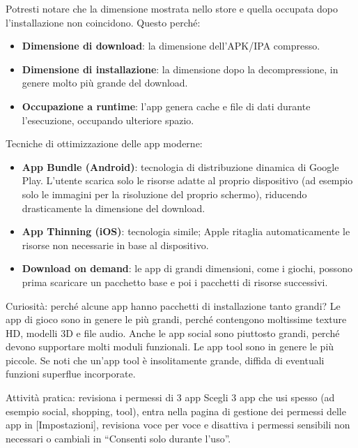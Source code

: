 
Potresti notare che la dimensione mostrata nello store e quella occupata dopo l'installazione non coincidono. Questo perché:

\begin{itemize}
  \item \textbf{Dimensione di download}: la dimensione dell'APK/IPA compresso.
  \item \textbf{Dimensione di installazione}: la dimensione dopo la decompressione, in genere molto più grande del download.
  \item \textbf{Occupazione a runtime}: l'app genera cache e file di dati durante l'esecuzione, occupando ulteriore spazio.
\end{itemize}

Tecniche di ottimizzazione delle app moderne:

\begin{itemize}
  \item \textbf{App Bundle (Android)}: tecnologia di distribuzione dinamica di Google Play. L'utente scarica solo le risorse adatte al proprio dispositivo (ad esempio solo le immagini per la risoluzione del proprio schermo), riducendo drasticamente la dimensione del download.
  \item \textbf{App Thinning (iOS)}: tecnologia simile; Apple ritaglia automaticamente le risorse non necessarie in base al dispositivo.
  \item \textbf{Download on demand}: le app di grandi dimensioni, come i giochi, possono prima scaricare un pacchetto base e poi i pacchetti di risorse successivi.
\end{itemize}

\begin{tcbinfo}{Curiosità: perché alcune app hanno pacchetti di installazione tanto grandi?}
Le app di gioco sono in genere le più grandi, perché contengono moltissime texture HD, modelli 3D e file audio. Anche le app social sono piuttosto grandi, perché devono supportare molti moduli funzionali. Le app tool sono in genere le più piccole. Se noti che un'app tool è insolitamente grande, diffida di eventuali funzioni superflue incorporate.

\end{tcbinfo}

\begin{tcbpractice}{Attività pratica: revisiona i permessi di 3 app}
Scegli 3 app che usi spesso (ad esempio social, shopping, tool), entra nella pagina di gestione dei permessi delle app in [Impostazioni], revisiona voce per voce e disattiva i permessi sensibili non necessari o cambiali in “Consenti solo durante l'uso”.

\end{tcbpractice}
